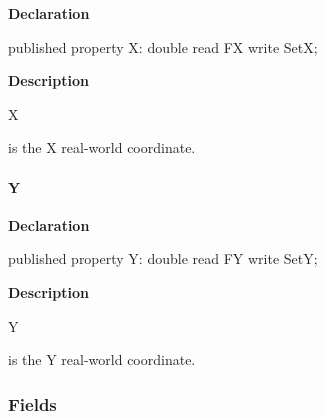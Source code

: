 \documentclass{report}
\begin{document}
\begin{list}{}{
\setlength{\itemindent}{0cm}
\setlength{\listparindent}{0cm}
\setlength{\leftmargin}{\evensidemargin}
\addtolength{\leftmargin}{\tmplength}
\settowidth{\labelsep}{X}
\addtolength{\leftmargin}{\labelsep}
\setlength{\labelwidth}{\tmplength}
}
\begin{flushleft}
\item[\textbf{Declaration}\hfill]
\begin{ttfamily}
published property X: double read FX write SetX;\end{ttfamily}


\end{flushleft}
\par
\item[\textbf{Description}]
\begin{ttfamily}X\end{ttfamily} is the X real{-}world coordinate.

\end{list}
\paragraph*{Y}\hspace*{\fill}

\begin{list}{}{
\setlength{\itemindent}{0cm}
\setlength{\listparindent}{0cm}
\setlength{\leftmargin}{\evensidemargin}
\addtolength{\leftmargin}{\tmplength}
\settowidth{\labelsep}{X}
\addtolength{\leftmargin}{\labelsep}
\setlength{\labelwidth}{\tmplength}
}
\begin{flushleft}
\item[\textbf{Declaration}\hfill]
\begin{ttfamily}
published property Y: double read FY write SetY;\end{ttfamily}


\end{flushleft}
\par
\item[\textbf{Description}]
\begin{ttfamily}Y\end{ttfamily} is the Y real{-}world coordinate.

\end{list}
\subsubsection*{\large{\textbf{Fields}}\normalsize\hspace{1ex}\hfill}
\end{document}
